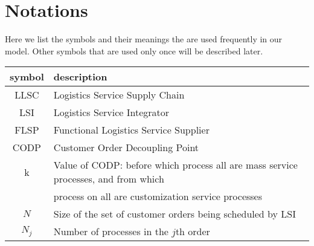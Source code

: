 \documentclass{llncs}
\begin{document}
\section{Notations}
Here we list the symbols and their meanings the are used frequently in our model. Other symbols that are used
only once will be described later.
\begin{center}
\begin{tabular}{c|l}
\hline
symbol\hspace{1cm} &\hspace{1cm}description\hspace{4cm}\\ \hline
LLSC\hspace{1cm} & \hspace{1cm}Logistics Service Supply Chain \hspace{4cm}\\
LSI\hspace{1cm} & \hspace{1cm}Logistics Service Integrator \hspace{4cm}\\
FLSP\hspace{1cm} & \hspace{1cm}Functional Logistics Service Supplier \hspace{4cm}\\
CODP\hspace{1cm} & \hspace{1cm}Customer  Order  Decoupling  Point \hspace{4cm}\\
k\hspace{1cm} & \hspace{1cm}Value of CODP: before which process all are mass service processes, and from which  \hspace{4cm}\\
\hspace{1cm} & \hspace{1cm}process on all are customization service processes \hspace{4cm}\\
$N$\hspace{1cm} & \hspace{1cm}Size of the set of customer orders being scheduled by LSI \hspace{4cm}\\
$N_j$\hspace{1cm} & \hspace{1cm}Number of processes in the $j$th order\hspace{4cm}\\

\end{tabular}
\end{center}
\end{document}
